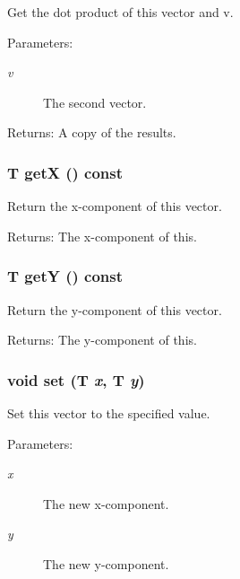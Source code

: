 Get the dot product of this vector and v. \begin{Desc}
\item[Parameters:]
\begin{description}
\item[{\em v}]The second vector. \end{description}
\end{Desc}
\begin{Desc}
\item[Returns:]A copy of the results. \end{Desc}
\subsubsection{\setlength{\rightskip}{0pt plus 5cm}T getX () const\hspace{0.3cm}{\tt  [inline]}}\label{classEngine_1_1Vector2_32f958cb13d5ddf9830638e3dd8e185a}


Return the x-component of this vector. \begin{Desc}
\item[Returns:]The x-component of this. \end{Desc}
\subsubsection{\setlength{\rightskip}{0pt plus 5cm}T getY () const\hspace{0.3cm}{\tt  [inline]}}\label{classEngine_1_1Vector2_4827b3c824389de233893405273de62e}


Return the y-component of this vector. \begin{Desc}
\item[Returns:]The y-component of this. \end{Desc}
\subsubsection{\setlength{\rightskip}{0pt plus 5cm}void set (T {\em x}, T {\em y})\hspace{0.3cm}{\tt  [inline]}}\label{classEngine_1_1Vector2_b850a64601a4644d9e8fb330c0334e14}


Set this vector to the specified value. \begin{Desc}
\item[Parameters:]
\begin{description}
\item[{\em x}]The new x-component. \item[{\em y}]The new y-component. \end{description}
\end{Desc}
